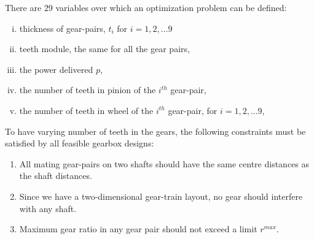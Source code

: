 There are 29 variables over which an optimization problem can be defined:
\begin{enumerate}[(i)]
  \item thickness of gear-pairs, $t_i$ for $i = 1, 2, \dots 9$
  \item teeth module, the same for all the gear pairs,
  \item the power delivered $p$,
  \item the number of teeth in pinion of the $i^{th}$ gear-pair, 
  \item the number of teeth in wheel of the $i^{th}$ gear-pair, for $i = 1, 2, \dots 9$,
\end{enumerate}

To have varying number of teeth in the gears, the following 
constraints must be satisfied by all feasible gearbox designs:

\begin{enumerate}
  \item All mating gear-pairs on  two shafts should have the same 
   centre distances as the shaft distances.
  \item Since we have a two-dimensional gear-train layout, no gear 
   should interfere with any shaft.
  \item Maximum gear ratio in any gear pair should not exceed a limit
   $r^{max}$.
\end{enumerate}



